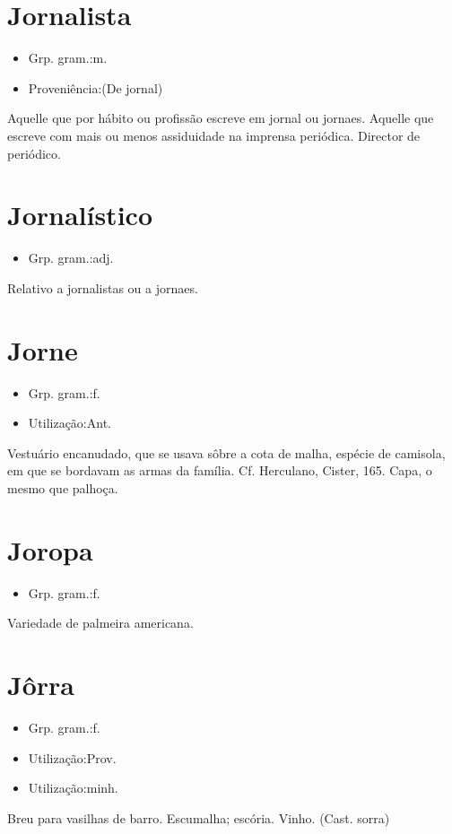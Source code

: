 \documentclass{article}
\begin{document}
\section{Jornalista}
\begin{itemize}
\item {Grp. gram.:m.}
\end{itemize}
\begin{itemize}
\item {Proveniência:(De \textunderscore jornal\textunderscore )}
\end{itemize}
Aquelle que por hábito ou profissão escreve em jornal ou jornaes.
Aquelle que escreve com mais ou menos assiduidade na imprensa periódica.
Director de periódico.
\section{Jornalístico}
\begin{itemize}
\item {Grp. gram.:adj.}
\end{itemize}
Relativo a jornalistas ou a jornaes.
\section{Jorne}
\begin{itemize}
\item {Grp. gram.:f.}
\end{itemize}
\begin{itemize}
\item {Utilização:Ant.}
\end{itemize}
Vestuário encanudado, que se usava sôbre a cota de malha, espécie de camisola, em que se bordavam as armas da família. Cf. Herculano, \textunderscore Cister\textunderscore , 165.
Capa, o mesmo que \textunderscore palhoça\textunderscore .
\section{Joropa}
\begin{itemize}
\item {Grp. gram.:f.}
\end{itemize}
Variedade de palmeira americana.
\section{Jôrra}
\begin{itemize}
\item {Grp. gram.:f.}
\end{itemize}
\begin{itemize}
\item {Utilização:Prov.}
\end{itemize}
\begin{itemize}
\item {Utilização:minh.}
\end{itemize}
Breu para vasilhas de barro.
Escumalha; escória.
Vinho.
(Cast. \textunderscore sorra\textunderscore )
\end{document}
